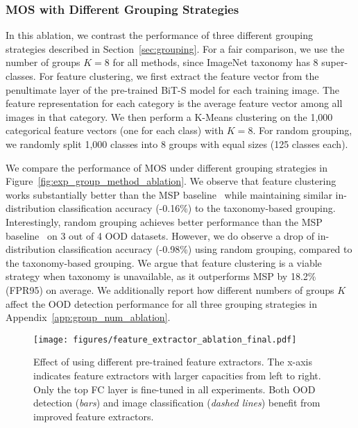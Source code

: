 \documentclass[final]{cvpr}
\begin{document}
\subsubsection{MOS with Different Grouping Strategies}
\vspace{-0.2cm}
\label{sec:grouping_method_ablation}
In this ablation, we contrast the performance of three different grouping strategies described in Section~\ref{sec:grouping}. For a fair comparison, we use the number of groups $K=8$ for all methods, since ImageNet taxonomy has 8 super-classes.
For feature clustering, we first extract the feature vector from the penultimate layer of the pre-trained BiT-S model for each training image. The feature representation for each category is the average feature vector among all images in that category. We then perform a K-Means clustering on the 1,000 categorical feature vectors (one for each class) with $K=8$. For random grouping, we randomly split 1,000 classes into 8 groups with equal sizes (125 classes each). 

We compare the performance of MOS under different grouping strategies in Figure~\ref{fig:exp_group_method_ablation}. We observe that feature clustering works substantially better than the MSP baseline~\cite{hendrycks2016baseline} while maintaining similar in-distribution classification accuracy (-0.16\%) to the taxonomy-based grouping. Interestingly, random grouping achieves better performance than the MSP baseline~\cite{hendrycks2016baseline} on 3 out of 4 OOD datasets. However, we do observe a drop of in-distribution classification accuracy (-0.98\%) using random grouping, compared to the taxonomy-based grouping. We argue that feature clustering is a viable strategy when taxonomy is unavailable, as it outperforms MSP by 18.2\% (FPR95) on average. We additionally report how different numbers of groups $K$ affect the OOD detection performance for all three grouping strategies in Appendix~\ref{app:group_num_ablation}. 


\begin{figure*}[t]
    \centering
        \vspace{-0.2cm}
    \texttt{[image: figures/feature\_extractor\_ablation\_final.pdf]}
    \caption{\small{Effect of using different pre-trained feature extractors. The x-axis indicates feature extractors with larger capacities from left to right. Only the top FC layer is fine-tuned in all experiments. Both OOD detection (\textit{bars}) and image classification (\textit{dashed lines}) benefit from improved feature extractors.}}
    \vspace{-0.2cm}
    \label{fig:exp_feature_extractor_ablation}
\end{figure*}
\end{document}
